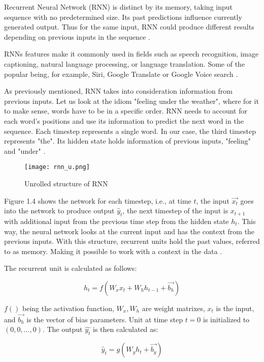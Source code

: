 Recurrent Neural Network (RNN) is distinct by its memory, taking input sequence with no predetermined size. Its past predictions influence currently generated output. Thus for the same input, RNN could produce different results depending on previous inputs in the sequence \cite{rnnDSmedium}.

RNNs features make it commonly used in fields such as speech recognition, image captioning, natural language processing, or language translation. Some of the popular being, for example, Siri, Google Translate or Google Voice search \cite{ibmrnn}.

As previously mentioned, RNN takes into consideration information from previous inputs. Let us look at the idiom "feeling under the weather", where for it to make sense, words have to be in a specific order. RNN needs to account for each word's positions and use its information to predict the next word in the sequence. Each timestep represents a single word. In our case, the third timestep represents "the". Its hidden state holds information of previous inputs, "feeling" and "under" \cite{ibmrnn}.

\begin{figure}[h]
	\centering
    \texttt{[image: rnn\_u.png]}
	\caption{Unrolled structure of RNN \cite{matous}}
	\label{fig:rnn}
\end{figure}


Figure 1.4 shows the network for each timestep, i.e., at time $t$, the input $\vec{x_t}$ goes into the network to produce output $\hat{y}_t$, the next timestep of the input is $x_{t+1}$ with additional input from the previous time step from the hidden state $h_{t}$. This way, the neural network looks at the current input and has the context from the previous inputs.
With this structure, recurrent units hold the past values, referred to as memory. Making it possible to work with a context in the data \cite{rnnin6}.

The recurrent unit is calculated as follows:

\begin{equation}
    {h_t = f(W_{x}x_t + W_{h}h_{t-1}+\vec{b_h})}
\end{equation}

$f()$ being the activation function, $W_x,W_h$ are weight matrixes, $x_t$ is the input, and $\vec{b_h}$ is the vector of bias parameters. Unit at time step $t=0$ is initialized to $(0,0,...,0)$. The output $\hat{y_t}$ is then calculated as:

\begin{equation}
    {\hat{y}_t = g(W_{y}h_t + \vec{b_y})}
\end{equation}

